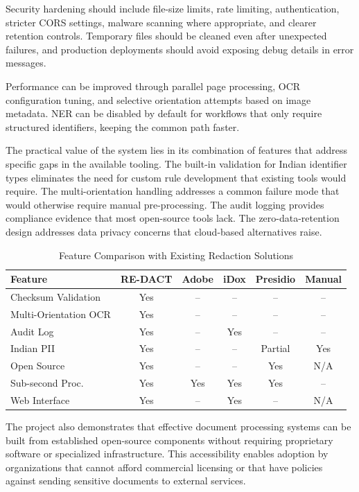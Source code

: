 Security hardening should include file-size limits, rate limiting, authentication, stricter CORS settings, malware scanning where appropriate, and clearer retention controls. Temporary files should be cleaned even after unexpected failures, and production deployments should avoid exposing debug details in error messages.

Performance can be improved through parallel page processing, OCR configuration tuning, and selective orientation attempts based on image metadata. NER can be disabled by default for workflows that only require structured identifiers, keeping the common path faster.

\bigskip

The practical value of the system lies in its combination of features that address specific gaps in the available tooling. The built-in validation for Indian identifier types eliminates the need for custom rule development that existing tools would require. The multi-orientation handling addresses a common failure mode that would otherwise require manual pre-processing. The audit logging provides compliance evidence that most open-source tools lack. The zero-data-retention design addresses data privacy concerns that cloud-based alternatives raise.

\begin{table}[htbp]
\caption{Feature Comparison with Existing Redaction Solutions}
\label{tab:comparison}
\centering
\begin{tabular}{|p{2.5cm}|c|c|c|c|c|}
\hline
\textbf{Feature} & \textbf{RE-DACT} & \textbf{Adobe} & \textbf{iDox} & \textbf{Presidio} & \textbf{Manual} \\
\hline
Checksum Validation & Yes & -- & -- & -- & -- \\
\hline
Multi-Orientation OCR & Yes & -- & -- & -- & -- \\
\hline
Audit Log & Yes & -- & Yes & -- & -- \\
\hline
Indian PII & Yes & -- & -- & Partial & Yes \\
\hline
Open Source & Yes & -- & -- & Yes & N/A \\
\hline
Sub-second Proc. & Yes & Yes & Yes & Yes & -- \\
\hline
Web Interface & Yes & -- & Yes & -- & N/A \\
\hline
\end{tabular}
\end{table}

The project also demonstrates that effective document processing systems can be built from established open-source components without requiring proprietary software or specialized infrastructure. This accessibility enables adoption by organizations that cannot afford commercial licensing or that have policies against sending sensitive documents to external services.

